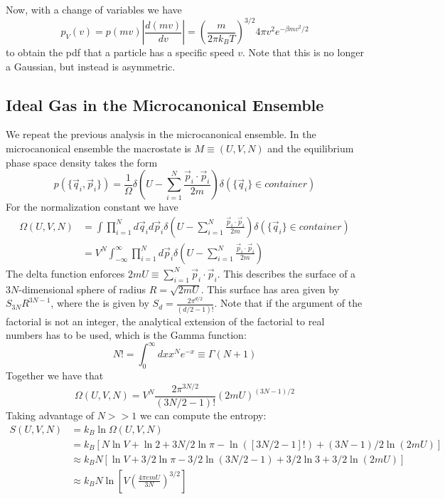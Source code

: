 \documentclass[12pt, a4paper, oneside, openright, titlepage]{book}
\begin{document}
Now, with a change of variables we have \begin{equation*}
    p_V(v) = p(mv)\left|\frac{d(mv)}{dv}\right| = \left(\frac{m}{2\pi k_BT}\right)^{3/2}4\pi v^2e^{-\beta mv^2/2}
\end{equation*}
to obtain the pdf that a particle has a specific speed $v$. Note that this is no longer a Gaussian, but instead is asymmetric.


\subsection{Ideal Gas in the Microcanonical Ensemble}

We repeat the previous analysis in the microcanonical ensemble. In the microcanonical ensemble the macrostate is $M \equiv (U,V,N)$ and the equilibrium phase space density takes the form \begin{equation*}
    p(\{\vec{q}_i,\vec{p}_i\}) = \frac{1}{\Omega}\delta\left(U - \sum_{i=1}^N\frac{\vec{p}_i\cdot\vec{p}_i}{2m}\right)\delta(\{\vec{q}_i\}\in container)
\end{equation*}
For the normalization constant we have \begin{align*}
    \Omega(U,V,N) &= \int\prod_{i=1}^Nd\vec{q}_id\vec{p}_i\delta\left(U - \sum_{i=1}^N\frac{\vec{p}_i\cdot\vec{p}_i}{2m}\right)\delta(\{\vec{q}_i\}\in container) \\
    &= V^N\int_{-\infty}^{\infty}\prod_{i=1}^Nd\vec{p}_i\delta\left(U - \sum_{i=1}^N\frac{\vec{p}_i\cdot\vec{p}_i}{2m}\right)
\end{align*}
The delta function enforces $2mU \equiv \sum_{i=1}^N\vec{p}_i\cdot\vec{p}_i$. This describes the surface of a $3N$-dimensional sphere of radius $R = \sqrt{2m U}$. This surface has area given by $S_{3N}R^{3N-1}$, where the  is given by $S_d = \frac{2\pi^{d/2}}{(d/2-1)!}$. Note that if the argument of the factorial is not an integer, the analytical extension of the factorial to real numbers has to be used, which is the Gamma function: \begin{equation*}
    N! = \int_0^{\infty}dx x^Ne^{-x} \equiv \Gamma(N+1)
\end{equation*}
Together we have that \begin{equation*}
    \Omega(U,V,N) = V^N\frac{2\pi^{3N/2}}{(3N/2-1)!}(2mU)^{(3N-1)/2}
\end{equation*}
Taking advantage of $N >>1$ we can compute the entropy: \begin{align*}
    S(U,V,N) &= k_B\ln\Omega(U,V,N) \\
    &= k_B\left[N\ln V + \ln 2 + 3N/2\ln \pi - \ln([3N/2-1]!) + (3N-1)/2\ln(2mU)\right] \\
    &\approx k_BN[\ln V+3/2\ln\pi - 3/2\ln(3N/2-1) + 3/2\ln 3 + 3/2\ln(2mU)] \\
    &\approx k_BN\ln\left[V\left(\frac{4\pi emU}{3N}\right)^{3/2}\right]
\end{align*}
\end{document}
